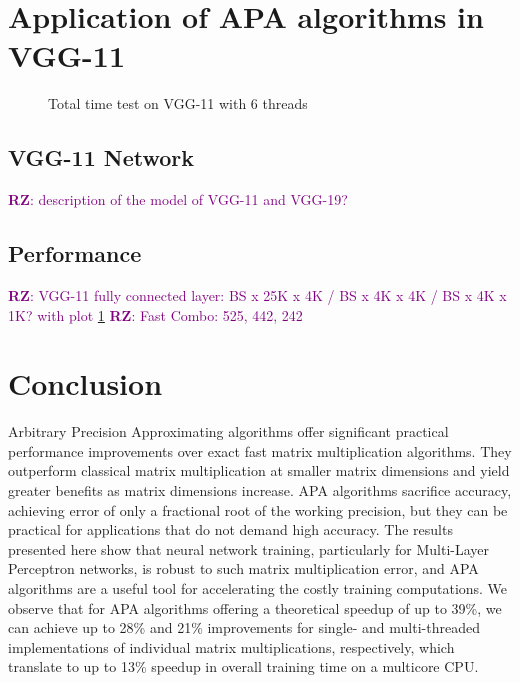 \documentclass[sigconf,review,anonymous]{acmart}
\newcommand{\RZ}[1]{\textcolor{purple}{\textbf{RZ}: #1}}
\begin{document}
\section{Application of APA algorithms in VGG-11}

\begin{figure}[hb!]
\centering

\caption{Total time test on VGG-11 with 6 threads}
\label{fig:vgg}
\end{figure}

\subsection{VGG-11 Network}
\RZ{description of the model of VGG-11 and VGG-19?}





\subsection{Performance}
\RZ{VGG-11 fully connected layer: BS x 25K x 4K / BS x 4K x 4K / BS x 4K x 1K? with plot}
\cref{fig:vgg}
\RZ{Fast Combo: 525, 442, 242}


\section{Conclusion}

Arbitrary Precision Approximating algorithms offer significant practical performance improvements over exact fast matrix multiplication algorithms.
They outperform classical matrix multiplication at smaller matrix dimensions and yield greater benefits as matrix dimensions increase.
APA algorithms sacrifice accuracy, achieving error of only a fractional root of the working precision, but they can be practical for applications that do not demand high accuracy.
The results presented here show that neural network training, particularly for Multi-Layer Perceptron networks, is robust to such matrix multiplication error, and APA algorithms are a useful tool for accelerating the costly training computations.
We observe that for APA algorithms offering a theoretical speedup of up to 39\%, we can achieve up to 28\% and 21\% improvements for single- and multi-threaded implementations of individual matrix multiplications, respectively, which translate to up to 13\% speedup in overall training time on a multicore CPU.
\end{document}

